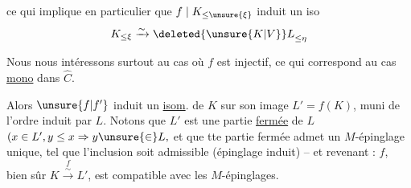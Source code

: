 ce qui implique en particulier que $f\mid K_{\leq\unsure{\xi}}$ induit un iso
\[
K_{\leq\xi}\xrightarrow{\sim}{\deleted{\unsure{K|V}}L}_{\leq\eta}
\]

Nous nous intéressons surtout au cas où $f$ est injectif, ce qui correspond au  cas  \uline{mono} dans $\widehat C$.

Alors $\unsure{f|f'}$ induit un \uline{isom}. de $K$ sur   son image $L'=f(K)$, muni de l'ordre induit par $L$. Notons que $L'$ est une partie \uline{fermée} de $L$ $(x\in L',y\leq x\Rightarrow y\unsure{\in}L,$ et que tte partie fermée admet un $M$-épinglage  unique, tel que l'inclusion soit admissible (épinglage induit) -- et revenant : $f$, bien sûr $K\overset{f}{\xrightarrow{\sim}}L'$, est compatible avec les $M$-épinglages.
